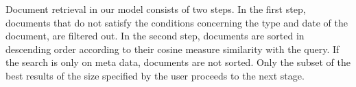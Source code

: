 Document retrieval in our model consists of two steps. In the first step, documents that do not satisfy the conditions concerning the type and date of the document, are filtered out. In the second step, documents are sorted in descending order according to their cosine measure similarity with the query. If the search is only on meta data, documents are not sorted. Only the subset of the best results of the size specified by the user proceeds to the next stage.



